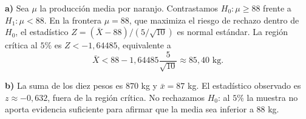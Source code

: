 \textbf{a)} Sea $\mu$ la producción media por naranjo. Contrastamos $H_0:\mu\ge88$ frente a $H_1:\mu<88$. En la frontera $\mu=88$, que maximiza el riesgo de rechazo dentro de $H_0$, el estadístico $Z=(\bar X-88)/(5/\sqrt{10})$ es normal estándar. La región crítica al $5\%$ es $Z<-1{,}64485$, equivalente a
\[
\bar X<88-1{,}64485\frac{5}{\sqrt{10}}\approx85{,}40\text{ kg}.
\]

\textbf{b)} La suma de los diez pesos es $870$ kg y $\bar x=87$ kg. El estadístico observado es $z\approx-0{,}632$, fuera de la región crítica. No rechazamos $H_0$: al $5\%$ la muestra no aporta evidencia suficiente para afirmar que la media sea inferior a $88$ kg.
